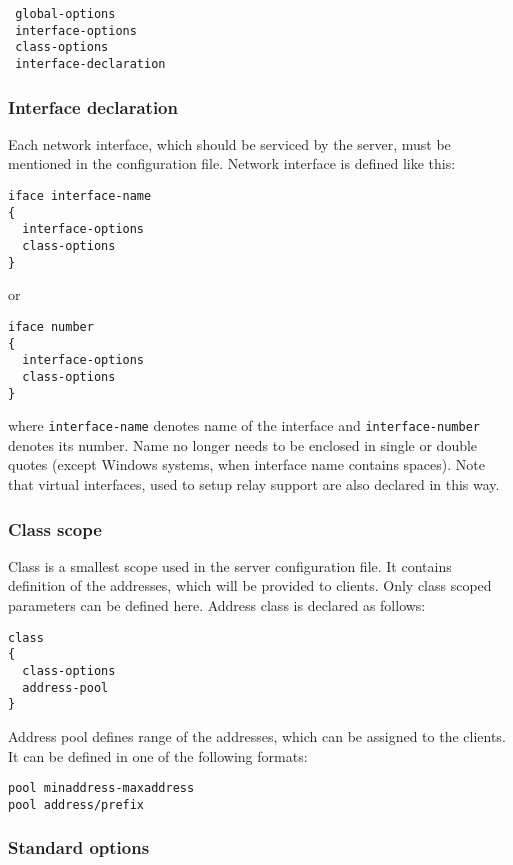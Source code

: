 \begin{verbatim}
 global-options
 interface-options
 class-options          
 interface-declaration
\end{verbatim}

\subsubsection{Interface declaration}
Each network interface, which should be serviced by the server, must be
mentioned in the configuration file. Network interface is defined like this:
\begin{verbatim}
iface interface-name
{
  interface-options
  class-options        
}
\end{verbatim}

or 

\begin{verbatim}
iface number 
{
  interface-options
  class-options        
}
\end{verbatim}

where \verb+interface-name+ denotes name of the interface and
\verb+interface-number+ denotes its number. Name no longer needs to be
enclosed in single or double quotes (except Windows systems, when
interface name contains spaces). Note that virtual interfaces, used
to setup relay support are also declared in this way.

\subsubsection{Class scope}
Class is a smallest scope used in the server configuration file. It
contains definition of the addresses, which will be provided to
clients. Only class scoped parameters can be defined here. Address class
is declared as follows:
\begin{verbatim}
class
{  
  class-options
  address-pool    
}
\end{verbatim}

Address pool defines range of the addresses, which can be assigned to the
clients. It can be defined in one of the following formats:
\begin{verbatim}
pool minaddress-maxaddress
pool address/prefix
\end{verbatim}

\subsubsection{Standard options}

